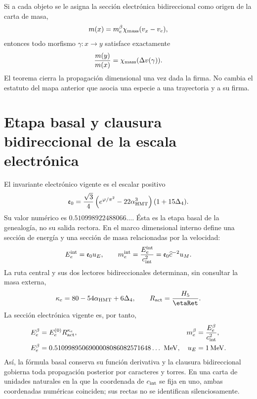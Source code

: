 Si a cada objeto se le asigna la sección electrónica bidireccional como
origen de la carta de masa,
\[
 m(x)=m_e^{\beta}\chi_{\rm mass}(v_x-v_e),
\]
entonces todo morfismo \(\gamma:x\to y\) satisface exactamente
\[
 \frac{m(y)}{m(x)}
 =\chi_{\rm mass}(\Delta v(\gamma)).
\]
El teorema cierra la propagación dimensional una vez dada la firma. No cambia
el estatuto del mapa anterior que asocia una especie a una trayectoria y a
su firma.

\section{Etapa basal y clausura bidireccional de la escala electrónica}

El invariante electrónico vigente es el escalar positivo
\[
 \mathfrak e_0=
 \frac{\sqrt3}{4}
 \left(e^{\varphi/\pi^2}-22\alpha_{\rm HMT}^3\right)
 (1+15\Delta_4).
\]
Su valor numérico es
\(0.510998922488066\ldots\). Ésta es la etapa basal de la genealogía, no su
salida rectora. En el marco dimensional interno define una sección de energía
y una sección de masa relacionadas por la velocidad:
\begin{equation}
 E_e^{\rm int}=\mathfrak e_0u_E,
 \qquad
 m_e^{\rm int}=\frac{E_e^{\rm int}}{c_{\rm int}^{2}}
 =\mathfrak e_0\widehat c^{-2}u_M.
 \label{eq:electron-line-valued}
\end{equation}
La ruta central y sus dos lectores bidireccionales determinan, sin consultar
la masa externa,
\[
 \kappa_e=80-54\alpha_{\rm HMT}+6\Delta_4,
 \qquad R_{\rm act}=\frac{H_5}{\etaRet}.
\]
La sección electrónica vigente es, por tanto,
\begin{equation}
 \begin{aligned}
 E_e^{\beta}&=E_e^{(0)}R_{\rm act}^{\kappa_e},
 &m_e^{\beta}&=\frac{E_e^{\beta}}{c_{\rm int}^{2}},\\
 E_e^\beta
 &=0.5109989506900008086082571648\ldots\ {\rm MeV},
 &u_E&=1\,{\rm MeV}.
 \end{aligned}
 \label{eq:electron-line-valued-beta}
\end{equation}
Así, la fórmula basal conserva su función derivativa y la clausura
bidireccional gobierna toda propagación posterior por caracteres y torres.
En una carta de unidades naturales en la que la coordenada de
\(c_{\rm int}\) se fija en uno, ambas coordenadas numéricas coinciden; sus
rectas no se identifican silenciosamente.

